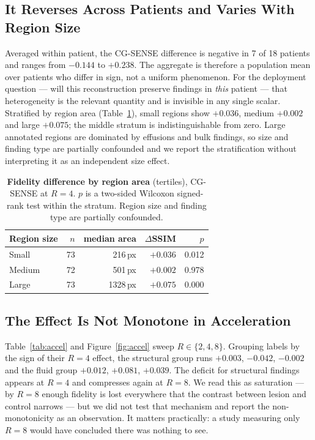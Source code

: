 \documentclass[letterpaper]{article} %
\begin{document}
\subsection{It Reverses Across Patients and Varies With Region Size}
Averaged within patient, the CG-SENSE difference is negative in 7 of 18 patients
and ranges from $-0.144$ to $+0.238$. The aggregate is therefore a population
mean over patients who differ in sign, not a uniform phenomenon. For the
deployment question --- will this reconstruction preserve findings in
\emph{this} patient --- that heterogeneity is the relevant quantity and is
invisible in any single scalar. Stratified by region area
(Table~\ref{tab:size}), small regions show $+0.036$, medium $+0.002$ and large
$+0.075$; the middle stratum is indistinguishable from zero. Large annotated
regions are dominated by effusions and bulk findings, so size and finding type
are partially confounded and we report the stratification without interpreting
it as an independent size effect.

\begin{table}[t]
\centering
\small
\begin{tabular}{lrrrr}
\toprule
Region size & $n$ & median area & $\Delta$SSIM & $p$ \\
\midrule
Small & 73 & 216\,px & $+0.036$ & 0.012 \\
Medium & 72 & 501\,px & $+0.002$ & 0.978 \\
Large & 73 & 1328\,px & $+0.075$ & 0.000 \\
\bottomrule
\end{tabular}
\caption{\textbf{Fidelity difference by region area} (tertiles), CG-SENSE at
$R{=}4$. $p$ is a two-sided Wilcoxon signed-rank test within the stratum. Region
size and finding type are partially confounded.}
\label{tab:size}
\end{table}

\subsection{The Effect Is Not Monotone in Acceleration}
Table~\ref{tab:accel} and Figure~\ref{fig:accel} sweep $R \in \{2,4,8\}$.
Grouping labels by the sign of their $R{=}4$ effect, the structural group runs
$+0.003$, $-0.042$, $-0.002$ and the fluid group $+0.012$, $+0.081$, $+0.039$.
The deficit for structural findings appears at $R{=}4$ and compresses again at
$R{=}8$. We read this as saturation --- by $R{=}8$ enough fidelity is lost
everywhere that the contrast between lesion and control narrows --- but we did
not test that mechanism and report the non-monotonicity as an observation. It
matters practically: a study measuring only $R{=}8$ would have concluded there
was nothing to see.
\end{document}
